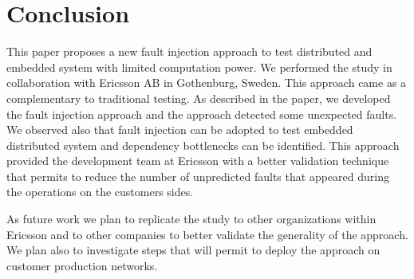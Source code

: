 \section{ Conclusion}\label{sec:conclusion}

This paper proposes a new fault injection approach to test distributed and embedded system with limited computation power. We performed the study in collaboration with Ericsson AB in Gothenburg, Sweden.
This approach came as a complementary to traditional testing. As described in the paper, we developed the fault injection approach and the approach detected some unexpected faults. We observed also that fault injection can be adopted to test embedded distributed system and dependency bottlenecks can be identified. This approach provided the development team at Ericsson with 
a better validation technique that permits to reduce the number of %
unpredicted faults that appeared during the operations on the customers sides. %

As future work we plan to replicate the study to other organizations within Ericsson and to other companies  to better validate the generality of the approach. %
We plan also to investigate steps that will permit to deploy the approach on customer production networks.  

